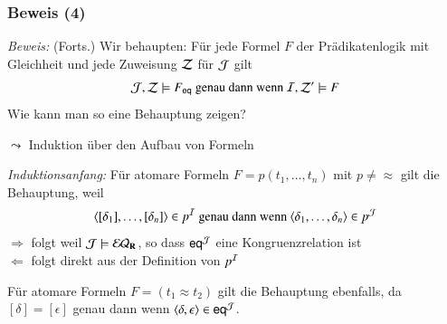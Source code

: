 \documentclass[onlymath]{beamer}
\begin{document}
\begin{frame}[t]\frametitle{Beweis (4)}

% 

\emph{Beweis:} {\footnotesize(Forts.)}
Wir behaupten: Für jede Formel $F$ der Prädikatenlogik mit Gleichheit und jede Zuweisung $\mathcal{Z}$ für $\mathcal{J}$ gilt
\[ \mathcal{J},\mathcal{Z}\models F_{\textsf{eq}} \text{ genau dann wenn } \mathcal{I},\mathcal{Z}'\models F \]
Wie kann man so eine Behauptung zeigen?\bigskip\pause

$\leadsto$ \alert{Induktion über den Aufbau von Formeln}\bigskip

\emph{Induktionsanfang:} Für atomare Formeln $F=p(t_1,\ldots,t_n)$ mit $p\neq{\approx}$ gilt die Behauptung,
weil
\[ \langle{[\delta_1],\ldots,[\delta_n]}\rangle\in p^{\mathcal{I}}\text{ genau dann wenn }\langle{\delta_1,\ldots,\delta_n}\rangle\in p^{\mathcal{J}} \]
$\Rightarrow$ folgt weil $\mathcal{J}\models\mathcal{EQ}_{\textbf{\textcolor{black}{R}}}$, so dass $\textsf{eq}^{\mathcal{J}}$ eine Kongruenzrelation ist\\
$\Leftarrow$ folgt direkt aus der Definition von $p^{\mathcal{I}}$
\bigskip\pause

Für atomare Formeln $F=(t_1\approx t_2)$ gilt die Behauptung ebenfalls, da $[\delta]=[\epsilon]$ genau dann wenn $\langle{\delta,\epsilon}\rangle\in\textsf{eq}^{\mathcal{J}}$.
\end{frame}
\end{document}
